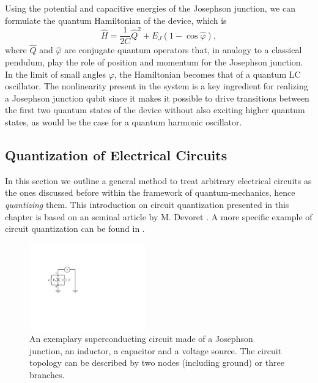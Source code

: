 \smallskip

Using the potential and capacitive energies of the Josephson junction, we can formulate the quantum Hamiltonian of the device, which is
%
\begin{equation}
\hat{H} = \frac{1}{2C}\hat{Q}^2+E_J(1-\cos{\hat{\varphi}}),
\end{equation}
%
where $\hat{Q}$ and $\hat{\varphi}$ are conjugate quantum operators that, in analogy to a classical pendulum, play the role of position and momentum for the Josephson junction. In the limit of small angles $\varphi$, the Hamiltonian becomes that of a quantum LC oscillator. The nonlinearity present in the system is a key ingredient for realizing a Josephson junction qubit since it makes it possible to drive transitions between the first two quantum states of the device without also exciting higher quantum states, as would be the case for a quantum harmonic oscillator.

\subsection{Quantization of Electrical Circuits}

In this section we outline a general method to treat arbitrary electrical circuits as the ones discussed before within the framework of quantum-mechanics, hence {\it quantizing} them. This introduction on circuit quantization presented in this chapter is based on an seminal article by M. Devoret \cite{devoret_quantum_1995}. A more specific example of circuit quantization can be found in \citep{burkard_multilevel_2004}.

\begin{figure}
	\includegraphics[width=5cm]{"./material/figures/introduction/sample_circuit"}
	\caption{An exemplary superconducting circuit made of a Josephson junction, an inductor, a capacitor and a voltage source. The circuit topology can be described by two nodes (including ground) or three branches.}
	\label{fig:SampleCircuit}
\end{figure}

